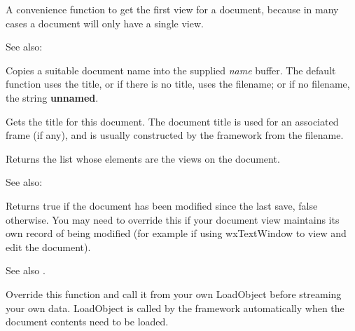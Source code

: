 A convenience function to get the first view for a document, because
in many cases a document will only have a single view.

See also: 

\label{wxdocumentgetprintablename}


Copies a suitable document name into the supplied {\it name} buffer. The default
function uses the title, or if there is no title, uses the filename; or if no
filename, the string {\bf unnamed}. 


\label{wxdocumentgettitle}


Gets the title for this document. The document title is used for an associated
frame (if any), and is usually constructed by the framework from
the filename.

\label{wxdocumentgetviews}


Returns the list whose elements are the views on the document.

See also: 

\label{wxdocumentismodified}


Returns true if the document has been modified since the last save, false otherwise.
You may need to override this if your document view maintains its own
record of being modified (for example if using wxTextWindow to view and edit the document).

See also .

\label{wxdocumentloadobject}



Override this function and call it from your own LoadObject before
streaming your own data. LoadObject is called by the framework
automatically when the document contents need to be loaded.

